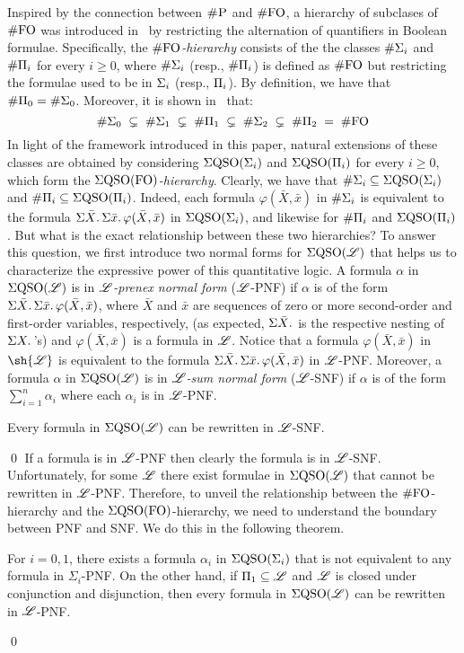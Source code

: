 
Inspired by the connection between $\text{\sc \#P}$ and $\#{\rm FO}$, a hierarchy of subclases of $\#{\rm FO}$ was introduced in~\cite{SalujaST95} 
by restricting the alternation of quantifiers in Boolean formulae.
Specifically, the \emph{$\#{\rm FO}$-hierarchy} consists of the 
the classes $\#\Sigma_{i}$ and $\#\Pi_{i}$ for every $i \geq 0$, where $\#\Sigma_{i}$ (resp., $\#\Pi_{i}$) is defined as $\#{\rm FO}$ but restricting the formulae used to be in $\Sigma_{i}$ (resp., $\Pi_{i}$).
By definition, we have that $\#\Pi_{0} = \#\Sigma_{0}$. Moreover, it is shown in~\cite{SalujaST95} that:
\[
\#\Sigma_{0} \; \subsetneq \; \#\Sigma_{1} \; \subsetneq \; \#\Pi_{1} \; \subsetneq \; \#\Sigma_{2} \; \subsetneq \; \#\Pi_{2} \; = \; \#{\rm FO} 
\]
In light of the framework introduced in this paper, natural extensions of these classes are obtained by considering 
$\Sigma{\rm QSO}(\Sigma_{i})$ and $\Sigma{\rm QSO}(\Pi_{i})$ for every $i \geq 0$, which form the \emph{$\Sigma{\rm QSO}({\rm FO})$-hierarchy}.
Clearly, we have that $\#\Sigma_{i} \subseteq \Sigma{\rm QSO}(\Sigma_{i})$ and $\#\Pi_{i} \subseteq \Sigma{\rm QSO}(\Pi_{i})$. Indeed, each formula $\varphi(\bar{X}, \bar{x})$ in $\#\Sigma_{i}$ is equivalent to the formula $\Sigma{\bar X}.\, \Sigma{\bar x}.\, \varphi(\bar{X}, \bar{x})$ in $\Sigma{\rm QSO}(\Sigma_{i})$, and likewise for $\#\Pi_{i}$ and $\Sigma{\rm QSO}(\Pi_{i})$.
But what is the exact relationship between these two hierarchies?
To answer this question, we first introduce two normal forms for $\Sigma{\rm QSO}(\mathscr{L})$ that helps us to characterize the expressive power of this quantitative logic.
A formula $\alpha$ in $\Sigma{\rm QSO}(\mathscr{L})$ is in \emph{$\mathscr{L}$-prenex normal form} ($\mathscr{L}$-PNF) 
if $\alpha$ is of the form
$\Sigma{\bar{X}}.\, \Sigma{\bar{x}}.\, \varphi(\bar{X}, \bar{x})$,
where $\bar{X}$ and $\bar{x}$ are sequences of zero or more second-order and first-order variables, respectively, (as expected, $\Sigma{\bar{X}}.\,\!$ is the respective nesting of $\Sigma{X}.\,$'s) and $\varphi(\bar{X}, \bar{x})$ is a formula in $\mathscr{L}$. Notice that 
a formula $\varphi(\bar{X}, \bar{x})$ in $\sh{\LL}$ is equivalent to the formula $\Sigma{\bar X}.\, \Sigma{\bar x}.\, \varphi(\bar{X}, \bar{x})$ in $\mathscr{L}$-PNF. 
Moreover, a formula $\alpha$ in $\Sigma{\rm QSO}(\mathscr{L})$ is in \emph{$\mathscr{L}$-sum normal form} ($\mathscr{L}$-SNF) if $\alpha$ is of the form $\sum_{i=1}^n \alpha_i$ where each $\alpha_i$ is in $\mathscr{L}$-PNF. 
\begin{prop}\label{theo-pnf-snf}
Every formula in $\Sigma{\rm QSO}(\mathscr{L})$ can be rewritten in $\mathscr{L}$-SNF.
\end{prop}
\proof

\qed
If a formula is in $\mathscr{L}$-PNF then clearly the formula is in $\mathscr{L}$-SNF.
Unfortunately, for some $\mathscr{L}$ there exist formulae in $\Sigma{\rm QSO}(\mathscr{L})$  that cannot be rewritten in $\mathscr{L}$-PNF.
Therefore, to unveil the relationship between the $\#{\rm FO}$-hierarchy and the $\Sigma{\rm QSO}({\rm FO})$-hierarchy, we need to understand the boundary between PNF and SNF. We do this in the following theorem. 
\begin{thm}\label{theo-pi1-pnf}
For $i = 0,1$, there exists a formula $\alpha_i$ in $\Sigma{\rm QSO}(\Sigma_{i})$ that is not equivalent to any formula in $\Sigma_i$-PNF. 
On the other hand, if $\Pi_{1} \subseteq \mathscr{L}$ and $\mathscr{L}$ is closed under conjunction and disjunction, then every formula in $\Sigma{\rm QSO}(\mathscr{L})$ can be rewritten in $\mathscr{L}$-PNF. 
\end{thm}
\proof

\qed

